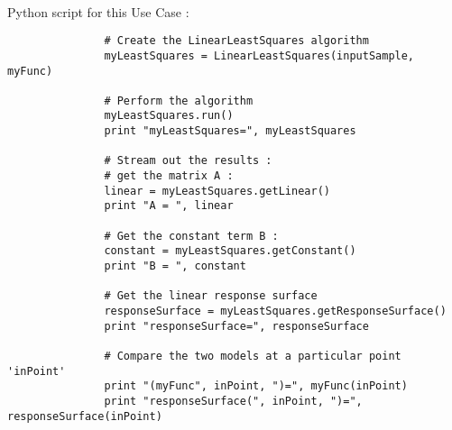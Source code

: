              \textspace\\
             Python  script for this Use Case :

             \begin{lstlisting}
               # Create the LinearLeastSquares algorithm
               myLeastSquares = LinearLeastSquares(inputSample, myFunc)

               # Perform the algorithm
               myLeastSquares.run()
               print "myLeastSquares=", myLeastSquares

               # Stream out the results :
               # get the matrix A :
               linear = myLeastSquares.getLinear()
               print "A = ", linear

               # Get the constant term B :
               constant = myLeastSquares.getConstant()
               print "B = ", constant

               # Get the linear response surface
               responseSurface = myLeastSquares.getResponseSurface()
               print "responseSurface=", responseSurface

               # Compare the two models at a particular point 'inPoint'
               print "(myFunc", inPoint, ")=", myFunc(inPoint)
               print "responseSurface(", inPoint, ")=", responseSurface(inPoint)
             \end{lstlisting}

